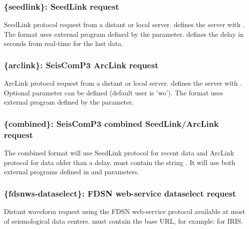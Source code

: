 \subsubsection{\{seedlink\}: SeedLink request}
\label{seedlink}

SeedLink protocol request from a distant or local server.  defines the server with . The format uses external program  defined by the   parameter.  defines the delay in seconds from real-time for the last data.


\subsubsection{\{arclink\}: SeisComP3 ArcLink request}
\label{arclink}

ArcLink protocol request from a distant or local server.  defines the server with . Optional parameter  can be defined (default user is 'wo'). The format uses external program  defined by the   parameter.

\subsubsection{\{combined\}: SeisComP3 combined SeedLink/ArcLink request}

The combined format will use SeedLink protocol for recent data and ArcLink protocol for data older than a delay.  must contain the string . It will use both external programs defined in   and  parameters.

\subsubsection{\{fdsnws-dataselect\}: FDSN web-service dataselect request}

Distant waveform request using the FDSN web-service protocol available at most of seismological data centers.  must contain the base URL, for example:  for IRIS.

